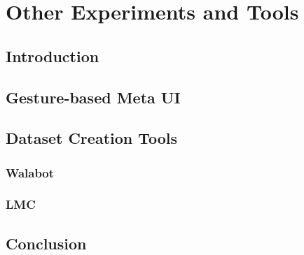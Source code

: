\chapter{Other Experiments and Tools}
\label{chap:radar-experiments}

\section{Introduction}

\section{Gesture-based Meta UI}

\section{Dataset Creation Tools}
\subsection{Walabot}

\subsection{LMC}


\section{Conclusion}